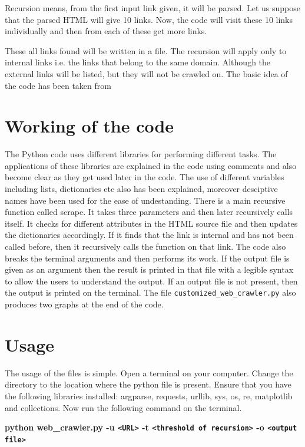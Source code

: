 \documentclass{report}
\begin{document}
Recursion means, from the first input link given, it will be parsed. Let us suppose that the parsed HTML will give 10 links. Now, the code will visit these 10 links individually and then from each of these get more links.

These all links found will be written in a file. The recursion will apply only to internal links i.e. the links that belong to the same domain. Although the external links will be listed, but they will not be crawled on. The basic idea of the code has been taken from \cite{basic_idea}

\section{Working of the code}
The Python code uses different libraries for performing different tasks. The applications of these libraries are explained in the code using comments and also become clear as they get used later in the code.
The use of different variables including lists, dictionaries etc also has been explained, moreover desciptive names have been used for the ease of undestanding.
There is a main recursive function called scrape. It takes three parameters and then later recursively calls itself. It checks for different attributes in the HTML source file and then updates the dictionaries accordingly. If it finds that the link is internal and has not been called before, then it recursively calls the function on that link.
The code also breaks the terminal arguments and then performs its work. If the output file is given as an argument then the result is printed in that file with a legible syntax to allow the users to understand the output. If an output file is not present, then the output is printed on the terminal. The file \texttt{customized\_web\_crawler.py} also produces two graphs at the end of the code.


\section{Usage}
\label{sec:Usage}
The usage of the files is simple. Open a terminal on your computer. Change the directory to the location where the python file is present. 
Ensure that you have the following libraries installed: argparse, requests, urllib, sys, os, re, matplotlib and collections.
Now run the following command on the terminal.

\textbf{python web{\_}crawler.py -u \texttt{<URL>} -t \texttt{<threshold of recursion>} -o \texttt{<output file>}}
\end{document}
